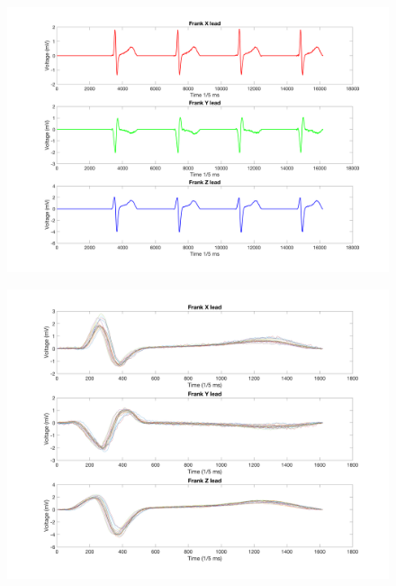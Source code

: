 \documentclass[12pt]{article}
\begin{document}
\begin{figure}[H]
	
	\centering
	\includegraphics[width = .95\textwidth]{Figures/FrankLeads1.png}
	\caption{ }
	\label{fig:Frank1}
\end{figure}

\begin{figure}[H]
	
	\centering
	\includegraphics[width = .95\textwidth]{Figures/FrankLeads2.png}
	\caption{ }
	\label{fig:Frank2}
\end{figure}
\end{document}
